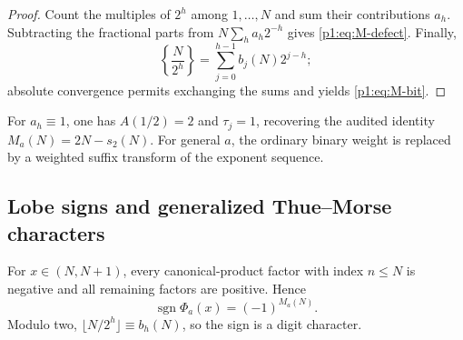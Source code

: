\documentclass[11pt,oneside]{article}
\numberwithin{equation}{section}
\theoremstyle{definition}
\theoremstyle{remark}
\newcommand{\sgn}{\operatorname{sgn}}
\begin{document}
\begin{proof}
Count the multiples of $2^h$ among $1,\ldots,N$ and sum their contributions $a_h$.
Subtracting the fractional parts from $N\sum_ha_h2^{-h}$ gives \eqref{p1:eq:M-defect}.
Finally,
\[
 \left\{\frac{N}{2^h}\right\}
 =\sum_{j=0}^{h-1}b_j(N)2^{j-h};
\]
absolute convergence permits exchanging the sums and yields \eqref{p1:eq:M-bit}.
\end{proof}

For $a_h\equiv1$, one has $A(1/2)=2$ and $\tau_j=1$, recovering the audited identity
$M_a(N)=2N-s_2(N)$.  For general $a$, the ordinary binary weight is replaced by a weighted
suffix transform of the exponent sequence.

\subsection{Lobe signs and generalized Thue--Morse characters}

For $x\in(N,N+1)$, every canonical-product factor with index $n\le N$ is negative and all
remaining factors are positive.  Hence
\begin{equation}
 \sgn\Phi_a(x)=(-1)^{M_a(N)}.
 \label{p1:eq:lobe-sign-count}
\end{equation}
Modulo two,
$\lfloor N/2^h\rfloor\equiv b_h(N)$, so the sign is a digit character.
\end{document}

